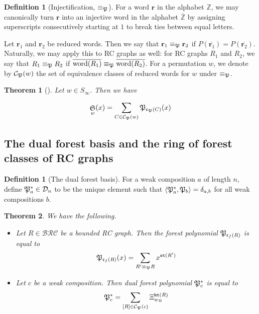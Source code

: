 \documentclass{amsart}
\newtheorem{theorem}{Theorem}[section]
\theoremstyle{definition}
\newtheorem{definition}[lemma]{Definition}
\theoremstyle{remark}
\numberwithin{equation}{subsection}
\DeclareMathOperator{\sch}{\mathfrak{S}}
\newcommand{\wof}[1]{w_{#1}}
\newcommand{\wtt}{\mathtt{wt}}
\newcommand{\hr}{\mathtt{ht}}
\newcommand{\BRC}{\mathcal{BRC}}
\newcommand{\dsch}{\ensuremath{\Xi}}
\newcommand{\dcoma}{\mathcal{D}}
\newcommand{\code}{\mathfrak{c}}
\begin{document}
\begin{definition}[Injectification, $\equiv_{\mathfrak{P}}$]
  For a word $\mathbf{r}$ in the alphabet $\mathbb{Z}$, we may canonically turn $\mathbf{r}$ into an injective word in the alphabet $\overline{\mathbb{Z}}$ by assigning superscripts consecutively starting at $1$ to break ties between equal letters.

Let $\mathbf{r}_1$ and $\mathbf{r}_2$ be reduced words. Then we say that $\mathbf{r}_1\equiv_{\mathfrak{P}}\mathbf{r}_2$ if $P(\overline{\mathbf{r}_1}) = P(\overline{\mathbf{r}_2})$. Naturally, we may apply this to RC graphs as well: for RC graphs $R_1$ and $R_2$, we say that $R_1\equiv_{\mathfrak{P}} R_2$ if $\overline{\mathrm{word}(R_1)}\equiv_{\mathfrak{P}} \overline{\mathrm{word}(R_2)}$. For a permutation $w$, we denote by $\mathcal{C}_{\mathfrak{P}}(w)$ the set of equivalence classes of reduced words for $w$ under $\equiv_{\mathfrak{P}}$.
\end{definition}

\begin{theorem}[{\cite[Theorem~1.4]{nadeau2024forest}}] \label{theorem:forestforest}
  Let $w\in S_\infty$. Then we have

  $$\sch_w(x) = \sum_{C\in \mathcal{C}_\forest(w)} \forest_{\code_\forest(C)}(x)$$
\end{theorem}


\subsection{The dual forest basis and the ring of forest classes of RC graphs}

\begin{definition}[The dual forest basis]
  For a weak composition $a$ of length $n$, define $\forest_a^*\in \dcoma_n$ to be the unique element such that $\langle \mathfrak{P}_a^*, \mathfrak{P}_b\rangle = \delta_{a,b}$ for all weak compositions $b$.
\end{definition}

\begin{theorem}\label{theorem:forestformula}
  We have the following.
  \begin{itemize}
\item[I] Let $R\in \BRC$ be a bounded RC graph. Then the forest polynomial $\mathfrak{P}_{\mathfrak{c}_f(R)}$ is equal to
$$\forest_{\fcode(R)}(x)=\sum_{R'\equiv_{\forest} R} x^{\wtt(R')}$$

\item[II] Let $c$ be a weak composition. Then dual forest polynomial $\mathfrak{P}^*_c$ is equal to
$$\forest^*_c = \sum_{[R]\in\mathcal{C}_\forest(c)} \dsch_{\wof{R}}^{\hr(R)}$$
  \end{itemize}
\end{theorem}
\end{document}
